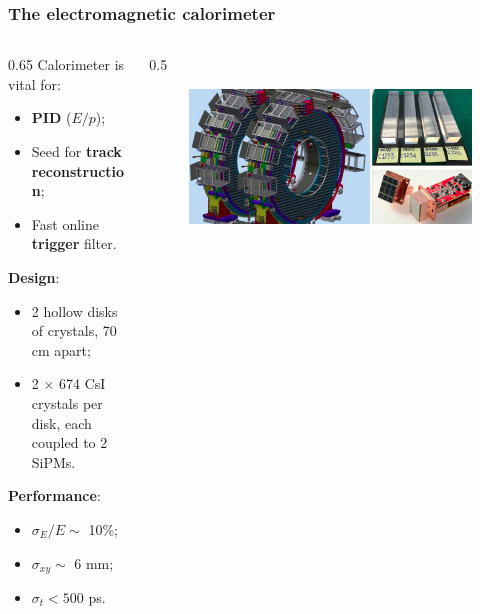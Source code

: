 \documentclass{beamer}
\begin{document}
\begin{frame}
    \frametitle{The electromagnetic calorimeter}
    \begin{columns}
            \begin{column}{0.65\framewidth}
      Calorimeter is vital for:
      \begin{itemize}
          \item \textbf{PID} ($E/p$);
          \item Seed for \textbf{track reconstruction};
          \item Fast online \textbf{trigger} filter.
      \end{itemize}
      \textbf{Design}:
      \begin{itemize}
        \item 2 hollow disks of crystals, 70 cm apart;
          \item 2 $\times$ 674 CsI crystals per disk, each coupled to 2 SiPMs.
      \end{itemize}
      \textbf{Performance}:
      \begin{itemize}
          \item $\sigma_E/E \sim$ 10\%;
          \item $\sigma_{xy}\sim$ 6 mm;
          \item $\sigma_t < 500$ ps.
      \end{itemize}
               \end{column}
        \begin{column}{0.5\framewidth}
            \begin{figure}[h]
            \centering
            \includegraphics[width=\columnwidth ]{figures/png/Screenshot_20240322_121000.png}
        \end{figure}
              \begin{figure}[h]
            \centering

\end{figure}
\end{column}
\end{columns}
\end{frame}
\end{document}
